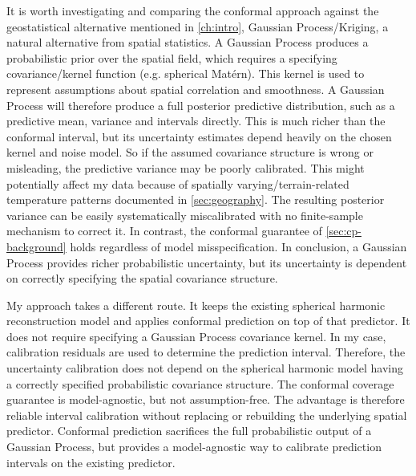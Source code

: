 It is worth investigating and comparing the conformal approach against the geostatistical alternative mentioned in \cref{ch:intro}, Gaussian Process/Kriging, a natural alternative from spatial statistics. A Gaussian Process produces a probabilistic prior over the spatial field, which requires a specifying covariance/kernel function (e.g. spherical Matérn). This kernel is used to represent assumptions about spatial correlation and smoothness. A Gaussian Process will therefore produce a full posterior predictive distribution, such as a predictive mean, variance and intervals directly. This is much richer than the conformal interval, but its uncertainty estimates depend heavily on the chosen kernel and noise model. So if the assumed covariance structure is wrong or misleading, the predictive variance may be poorly calibrated. This might potentially affect my data because of spatially varying/terrain-related temperature patterns documented in \cref{sec:geography}. The resulting posterior variance can be easily systematically miscalibrated with no finite-sample mechanism to correct it. In contrast, the conformal guarantee of \cref{sec:cp-background} holds regardless of model misspecification. In conclusion, a Gaussian Process provides richer probabilistic uncertainty, but its uncertainty is dependent on correctly specifying the spatial covariance structure. 

My approach takes a different route. It keeps the existing spherical harmonic reconstruction model and applies conformal prediction on top of that predictor. It does not require specifying a Gaussian Process covariance kernel. In my case, calibration residuals are used to determine the prediction interval. Therefore, the uncertainty calibration does not depend on the spherical harmonic model having a correctly specified probabilistic covariance structure. The conformal coverage guarantee is model-agnostic, but not assumption-free. The advantage is therefore reliable interval calibration without replacing or rebuilding the underlying spatial predictor. Conformal prediction sacrifices the full probabilistic output of a Gaussian Process, but provides a model-agnostic way to calibrate prediction intervals on the existing predictor.

